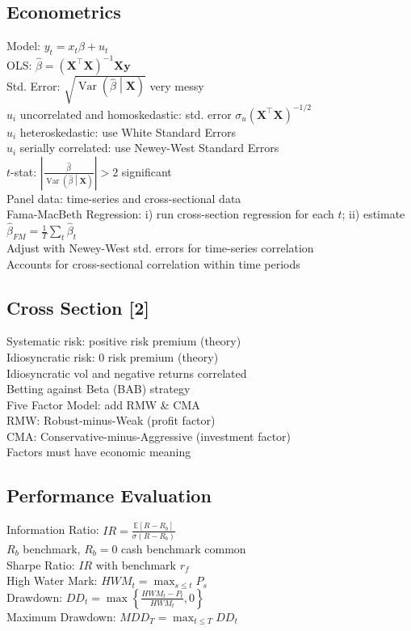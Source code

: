 	\subsection*{Econometrics}
	Model: $y_{t} = x_{t}\beta + u_{t}$\\
	OLS: $\hat{\beta} = \left(\mathbf{X}^{\intercal}\mathbf{X}\right)^{-1}\mathbf{X}\mathbf{y}$\\
	Std. Error: $\sqrt{\operatorname{Var}\left(\hat{\beta}\middle|\mathbf{X}\right)}$ very messy\\
	$u_{i}$ uncorrelated and homoskedastic: std. error $\sigma_{u}\left(\mathbf{X}^{\intercal}\mathbf{X}\right)^{-1/2}$\\
	$u_{i}$ heteroskedastic: use White Standard Errors\\
	$u_{i}$ serially correlated: use Newey-West Standard Errors\\
	$t$-stat: $\left|\frac{\hat{\beta}}{\operatorname{Var}\left(\hat{\beta}\middle|\mathbf{X}\right)}\right| > 2$ significant\\
	Panel data: time-series and cross-sectional data\\
	Fama-MacBeth Regression: i) run cross-section regression for each $t$; ii) estimate $\hat{\beta}_{FM} = \frac{1}{T}\sum_{t}\hat{\beta}_{t}$\\
	Adjust with Newey-West std. errors for time-series correlation\\
	Accounts for cross-sectional correlation within time periods
	
	\subsection*{Cross Section [2]}
	Systematic risk: positive risk premium (theory)\\
	Idiosyncratic risk: 0 risk premium (theory)\\
	Idiosyncratic vol and negative returns correlated\\
	Betting against Beta (BAB) strategy\\
	Five Factor Model: add RMW \& CMA\\
	RMW: Robust-minus-Weak (profit factor)\\
	CMA: Conservative-minus-Aggressive (investment factor)\\
	Factors must have economic meaning
	
	\subsection*{Performance Evaluation}
	Information Ratio: $IR = \frac{\mathbb{E}\left[R - R_{b}\right]}{\sigma\!\left(R - R_{b}\right)}$\\
	$R_{b}$ benchmark, $R_{b} = 0$ cash benchmark common\\
	Sharpe Ratio: $IR$ with benchmark $r_{f}$\\
	High Water Mark: $HWM_{t} = \max_{s\leq t} P_{s}$\\
	Drawdown: $DD_{t} = \max\left\{\frac{HWM_{t} - P_{t}}{HWM_{t}}, 0\right\}$\\
	Maximum Drawdown: $MDD_{T} = \max_{t\leq T}DD_{t}$
	
